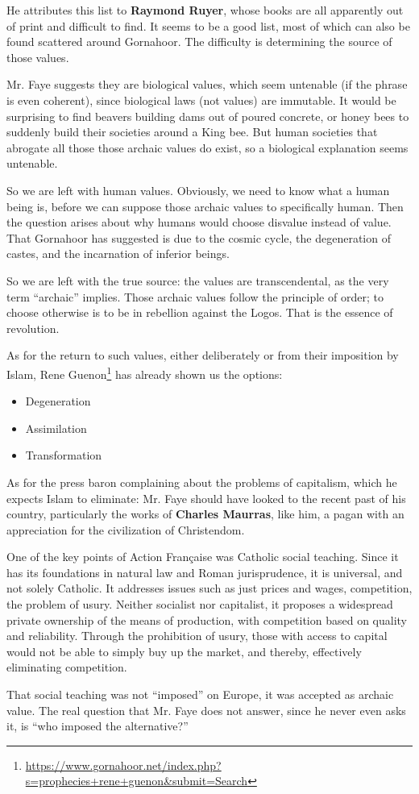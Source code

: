 He attributes this list to \textbf{Raymond Ruyer}, whose books are all apparently out of print and difficult to find. It seems to be a good list, most of which can also be found scattered around Gornahoor. The difficulty is determining the source of those values.

Mr. Faye suggests they are biological values, which seem untenable (if the phrase is even coherent), since biological laws (not values) are immutable. It would be surprising to find beavers building dams out of poured concrete, or honey bees to suddenly build their societies around a King bee. But human societies that abrogate all those those archaic values do exist, so a biological explanation seems untenable.

So we are left with human values. Obviously, we need to know what a human being is, before we can suppose those archaic values to specifically human. Then the question arises about why humans would choose disvalue instead of value. That Gornahoor has suggested is due to the cosmic cycle, the degeneration of castes, and the incarnation of inferior beings.

So we are left with the true source: the values are transcendental, as the very term ``archaic'' implies. Those archaic values follow the principle of order; to choose otherwise is to be in rebellion against the Logos. That is the essence of revolution.

As for the return to such values, either deliberately or from their imposition by Islam, Rene Guenon\footnote{\url{https://www.gornahoor.net/index.php?s=prophecies+rene+guenon\&submit=Search}} has already shown us the options:

\begin{itemize}
\item Degeneration
\item Assimilation
\item Transformation
\end{itemize}


As for the press baron complaining about the problems of capitalism, which he expects Islam to eliminate: Mr. Faye should have looked to the recent past of his country, particularly the works of \textbf{Charles Maurras}, like him, a pagan with an appreciation for the civilization of Christendom.

One of the key points of Action Française was Catholic social teaching. Since it has its foundations in natural law and Roman jurisprudence, it is universal, and not solely Catholic. It addresses issues such as just prices and wages, competition, the problem of usury. Neither socialist nor capitalist, it proposes a widespread private ownership of the means of production, with competition based on quality and reliability. Through the prohibition of usury, those with access to capital would not be able to simply buy up the market, and thereby, effectively eliminating competition.

That social teaching was not ``imposed'' on Europe, it was accepted as archaic value. The real question that Mr. Faye does not answer, since he never even asks it, is ``who imposed the alternative?''


